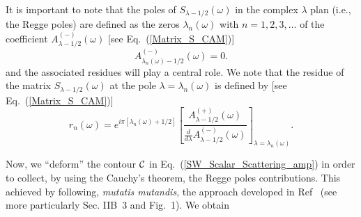 \documentclass[aps,prd,longbibliography,reprint,twocolumn,amsmath,amssymb,amsfonts,showpacs,superscriptaddress]{revtex4-1}%
\begin{document}
It is important to note that the poles of  $S_{\lambda -1/2} (\omega)$ in the complex $\lambda$ plan (i.e., the Regge poles) are defined  as  the zeros $\lambda_n(\omega)$ with $n=1,2,3,\ldots$ of the coefficient  $A^{(-)}_{\lambda-1/2} (\omega)$ [see Eq.~(\ref{Matrix_S_CAM})]
\begin{equation}\label{PR_def_Am}
A^{(-)}_{\lambda_n(\omega)-1/2} (\omega)=0.
\end{equation}
and the associated residues will play a central role. We note that the residue of the matrix $S_{\lambda-1/2}(\omega)$ at the pole $\lambda=\lambda_n(\omega)$ is defined by [see Eq.~(\ref{Matrix_S_CAM})]
\begin{equation}\label{residues_RP}
r_n(\omega)=e^{i\pi [\lambda_n(\omega)+1/2]} \left[ \frac{A_{\lambda -1/2}^{(+)}(\omega)}{\frac{d}{d \lambda}A_{\lambda -1/2}^{(-)}(\omega)}\right]_{\lambda=\lambda_n(\omega)}.
\end{equation}


Now, we ``deform'' the contour ${\cal C}$ in Eq.~(\ref{SW_Scalar_Scattering_amp}) in order to collect, by using the Cauchy's theorem, the Regge poles contributions. This achieved by following, \textit{mutatis mutandis}, the approach developed in Ref~\cite{Folacci:2019cmc} (see more particularly Sec. IIB~3 and Fig.~1). We obtain
\end{document}

